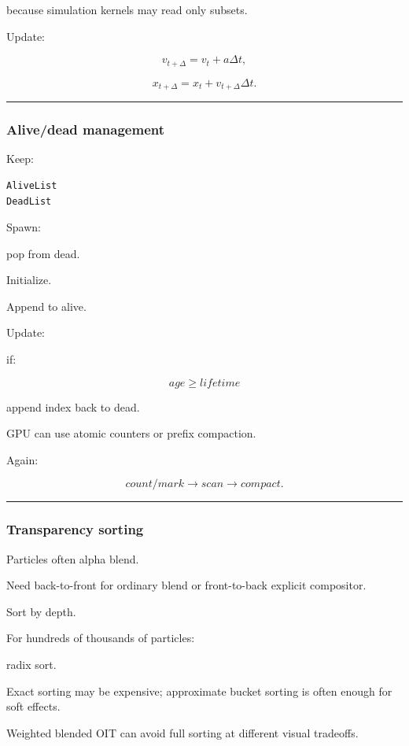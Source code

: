 because simulation kernels may read only subsets.

Update:

\[
v_{t+\Delta}
=
v_t+a\Delta t,
\]

\[
x_{t+\Delta}
=
x_t+v_{t+\Delta}\Delta t.
\]

\begin{center}\rule{0.5\linewidth}{0.5pt}\end{center}

\subsubsection{Alive/dead management}\label{alivedead-management}

Keep:

\begin{verbatim}
AliveList
DeadList
\end{verbatim}

Spawn:

pop from dead.

Initialize.

Append to alive.

Update:

if:

\[
age\ge lifetime
\]

append index back to dead.

GPU can use atomic counters or prefix compaction.

Again:

\[
count/mark
\rightarrow
scan
\rightarrow
compact.
\]

\begin{center}\rule{0.5\linewidth}{0.5pt}\end{center}

\subsubsection{Transparency sorting}\label{transparency-sorting}

Particles often alpha blend.

Need back-to-front for ordinary blend or front-to-back explicit compositor.

Sort by depth.

For hundreds of thousands of particles:

radix sort.

Exact sorting may be expensive; approximate bucket sorting is often enough for soft effects.

Weighted blended OIT can avoid full sorting at different visual tradeoffs.

